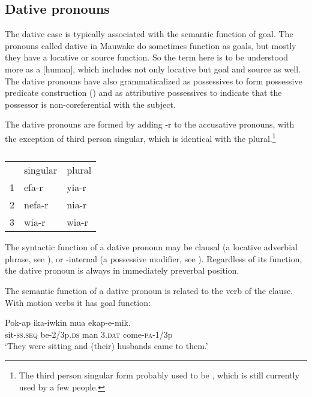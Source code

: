 \subsection{Dative pronouns}
{}
The dative case is typically associated with the semantic function of goal. The pronouns called dative in Mauwake do sometimes function as goals, but mostly they have a locative or source function. So the term here is to be understood more as a [\textstyleEmphasizedWords{\textsc{+}}human]\textstyleEmphasizedWords{ }, which includes not only locative but goal and source as well. The dative pronouns have also grammaticalized as possessives to form possessive predicate construction () and as attributive possessives to indicate that the possessor is non-coreferential with the subject. 

The dative pronouns are formed by adding -r to the accusative pronouns, with the exception of third person singular, which is identical with the plural.\footnote{The third person singular form probably used to be , which is still currently used by a few people.}

\begin{table}
\caption{}
\label{} 
\begin{tabular}{lll}
 &singular &plural\\
1 &efa-r &yia-r\\
2 &nefa-r &nia-r\\
3 &wia-r &wia-r\\
\end{tabular}
\end{table}


The syntactic function of a dative pronoun may be clausal (a locative adverbial phrase, see ), or -internal (a possessive modifier, see ). Regardless of its function, the dative pronoun is always in immediately preverbal position. 

The semantic function of a dative pronoun is related to the verb of the clause. With motion verbs it has goal function: 

\ea%
\label{ex:x1781}
\gll Pok-ap ika-iwkin mua  ekap-e-mik. \\
sit-\textsc{ss}.\textsc{seq} be-2/3p.\textsc{ds} man 3.\textsc{dat} come-\textsc{pa}-1/3p\\
\glt`They were sitting and (their) husbands came to them.'
\z

